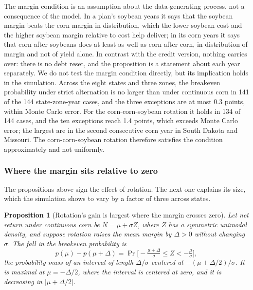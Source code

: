 \documentclass[11pt,letterpaper]{article}
\newtheorem{theorem}{Proposition}
\theoremstyle{remark}
\begin{document}
The margin condition is an assumption about the data-generating process, not a consequence of the model. In a plan's soybean years it says that the soybean margin beats the corn margin in distribution, which the lower soybean cost and the higher soybean margin relative to cost help deliver; in its corn years it says that corn after soybeans does at least as well as corn after corn, in distribution of margin and not of yield alone. In contrast with the credit version, nothing carries over: there is no debt reset, and the proposition is a statement about each year separately. We do not test the margin condition directly, but its implication holds in the simulation. Across the eight states and three zones, the breakeven probability under strict alternation is no larger than under continuous corn in 141 of the 144 state-zone-year cases, and the three exceptions are at most 0.3 points, within Monte Carlo error. For the corn-corn-soybean rotation it holds in 134 of 144 cases, and the ten exceptions reach 1.4 points, which exceeds Monte Carlo error; the largest are in the second consecutive corn year in South Dakota and Missouri. The corn-corn-soybean rotation therefore satisfies the condition approximately and not uniformly.

\subsubsection{\label{subsubsec:proposition_3}Where the margin sits relative to zero}

The propositions above sign the effect of rotation. The next one explains its size, which the simulation shows to vary by a factor of three across states.

\begin{theorem}[Rotation's gain is largest where the margin crosses zero]
\label{prop:margin}
Let net return under continuous corn be $N=\mu+\sigma Z$, where $Z$ has a symmetric unimodal density, and suppose rotation raises the mean margin by $\Delta>0$ without changing $\sigma$. The fall in the breakeven probability is
\begin{equation}
p(\mu)-p(\mu+\Delta)=\Pr\!\Big[-\tfrac{\mu+\Delta}{\sigma}\le Z<-\tfrac{\mu}{\sigma}\Big],
\end{equation}
the probability mass of an interval of length $\Delta/\sigma$ centered at $-(\mu+\Delta/2)/\sigma$. It is maximal at $\mu=-\Delta/2$, where the interval is centered at zero, and it is decreasing in $|\mu+\Delta/2|$.
\end{theorem}
\end{document}
